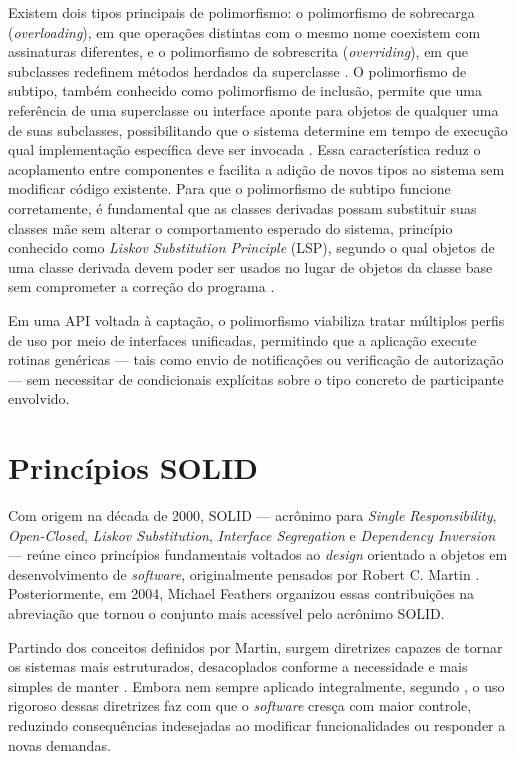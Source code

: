 Existem dois tipos principais de polimorfismo: o polimorfismo de sobrecarga (\textit{overloading}), em que operações distintas com o mesmo nome coexistem com assinaturas diferentes, e o polimorfismo de sobrescrita (\textit{overriding}), em que subclasses redefinem métodos herdados da superclasse \cite{booch2007}. O polimorfismo de subtipo, também conhecido como polimorfismo de inclusão, permite que uma referência de uma superclasse ou interface aponte para objetos de qualquer uma de suas subclasses, possibilitando que o sistema determine em tempo de execução qual implementação específica deve ser invocada \cite{sommerville2011}. Essa característica reduz o acoplamento entre componentes e facilita a adição de novos tipos ao sistema sem modificar código existente. Para que o polimorfismo de subtipo funcione corretamente, é fundamental que as classes derivadas possam substituir suas classes mãe sem alterar o comportamento esperado do sistema, princípio conhecido como \textit{Liskov Substitution Principle} (LSP), segundo o qual objetos de uma classe derivada devem poder ser usados no lugar de objetos da classe base sem comprometer a correção do programa \cite{martin2003}.

Em uma API voltada à captação, o polimorfismo viabiliza tratar múltiplos perfis de uso por meio de interfaces unificadas, permitindo que a aplicação execute rotinas genéricas --- tais como envio de notificações ou verificação de autorização --- sem necessitar de condicionais explícitas sobre o tipo concreto de participante envolvido.

\section{Princípios SOLID}
\label{sec:solid}

Com origem na década de 2000, SOLID --- acrônimo para \textit{Single Responsibility}, \textit{Open-Closed}, \textit{Liskov Substitution}, \textit{Interface Segregation} e \textit{Dependency Inversion} --- reúne cinco princípios fundamentais voltados ao \textit{design} orientado a objetos em desenvolvimento de \textit{software}, originalmente pensados por Robert C. Martin \citeyear{martin2003}. Posteriormente, em 2004, Michael Feathers organizou essas contribuições na abreviação que tornou o conjunto mais acessível pelo acrônimo SOLID.

Partindo dos conceitos definidos por Martin, surgem diretrizes capazes de tornar os sistemas mais estruturados, desacoplados conforme a necessidade e mais simples de manter \cite{martin2008}. Embora nem sempre aplicado integralmente, segundo , o uso rigoroso dessas diretrizes faz com que o \textit{software} cresça com maior controle, reduzindo consequências indesejadas ao modificar funcionalidades ou responder a novas demandas.

